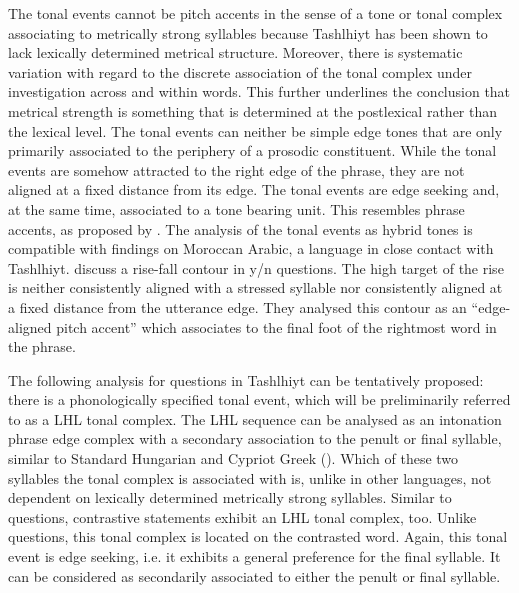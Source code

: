 The tonal events cannot be pitch accents in the sense of a tone or tonal complex associating to metrically strong 
syllables because Tashlhiyt has been shown to lack lexically determined metrical structure. Moreover, there is systematic variation with regard to the discrete association of the tonal complex under investigation across and within words. This further underlines the conclusion that metrical strength is something that is determined at the postlexical rather than the lexical level. The tonal events can neither be simple edge tones that are only primarily associated to the periphery of a prosodic constituent. While the tonal events are somehow attracted to the right edge of the phrase, they are not aligned at a fixed distance from its edge. The tonal events are edge seeking and, at the same time, associated to a tone bearing unit. This resembles phrase accents, as proposed by \citet{Grice.etal2000}. The analysis of the tonal events as hybrid tones is compatible with findings on Moroccan Arabic, a language in close contact with Tashlhiyt. \citet{Hellmuth.etal2015} discuss a rise-fall contour in y/n questions. The high target of the rise is neither consistently aligned with a stressed syllable nor consistently aligned at a fixed distance from the utterance edge. They analysed this contour as an “edge-aligned pitch accent” which associates to the final foot of the rightmost word in the phrase. 

The following analysis for questions in Tashlhiyt can be tentatively proposed: there is a phonologically specified tonal event, which will be preliminarily referred to as a LHL tonal complex. The LHL sequence can be analysed as an intonation phrase edge complex with a secondary association to the penult or final syllable, similar to Standard Hungarian and Cypriot Greek (\citealt{Grice.etal2000}). Which of these two syllables the tonal complex is associated with is, unlike in other languages, not dependent on lexically determined metrically strong syllables. Similar to questions, contrastive statements exhibit an LHL tonal complex, too. Unlike questions, this tonal complex is located on the contrasted word. Again, this tonal event is edge seeking, i.e. it exhibits a general preference for the final syllable. It can be considered as secondarily associated to either the penult or final syllable.

